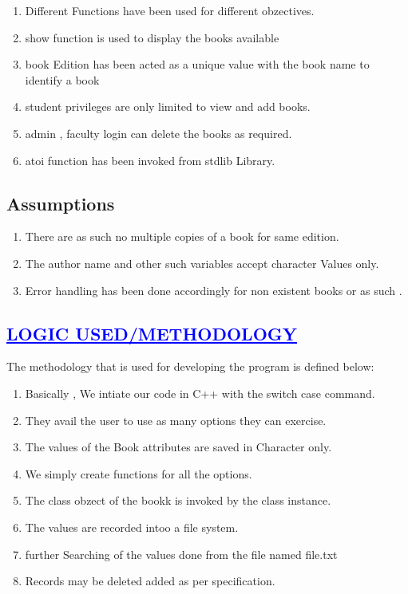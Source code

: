 \documentclass[a4paper,12pt]{report}
\begin{document}
\begin{enumerate}
\begin{enumerate}
\item Different Functions have been used for different obzectives.
\item show function is used to display the books available
\item book Edition has been acted as a unique value with the book name to identify a book
\item student privileges are only limited to view and add books.
\item admin , faculty login can delete the books as required.
\item atoi function has been invoked from stdlib Library.

\end{enumerate}

\section*{Assumptions}

\begin{enumerate}
\item There are as such no multiple copies of a book for same edition.
\item The author name and other such variables accept character Values only.
\item Error handling has been done accordingly for non existent books or as such .

\end{enumerate}
 
\begin{center}
\chapter{\textcolor{blue}{\underline {LOGIC USED/METHODOLOGY}}}
\end{center}
The methodology that is used for developing the program is defined below:\\

\begin{enumerate}
\item Basically , We intiate our code in C++ with the switch case command.
\item They avail the user to use as many options they can exercise.
\item The values of the Book attributes are saved in Character only.
\item We simply create functions for all the options.
\item The class obzect of the bookk is invoked by the class instance.
\item The values are recorded intoo a file system.
\item further Searching of the values done from the file named file.txt
\item Records may be deleted added as per specification.


\end{enumerate}
\end{enumerate}
\end{document}
